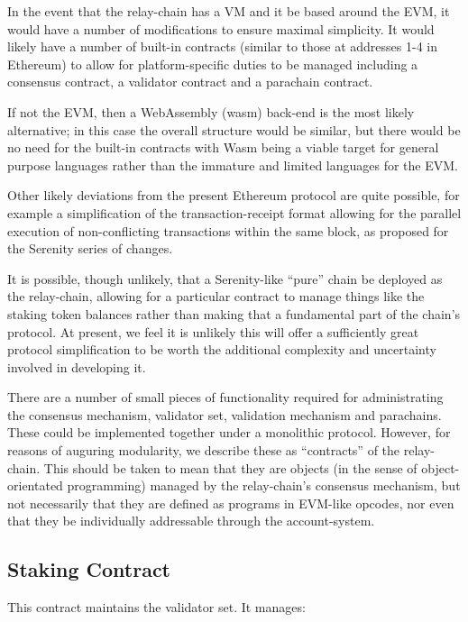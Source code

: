 \documentclass[9pt,oneside]{amsart}
\begin{document}
\begin{multicols}{2}
 In the event that the relay-chain has a VM and it be based around the EVM, it would have a number of modifications to ensure maximal simplicity. It would likely have a number of built-in contracts (similar to those at addresses 1-4 in Ethereum) to allow for platform-specific duties to be managed including a consensus contract, a validator contract and a parachain contract.

 If not the EVM, then a WebAssembly\cite{webassembly} (wasm) back-end is the most likely alternative; in this case the overall structure would be similar, but there would be no need for the built-in contracts with Wasm being a viable target for general purpose languages rather than the immature and limited languages for the EVM.

 Other likely deviations from the present Ethereum protocol are quite possible, for example a simplification of the transaction-receipt format allowing for the parallel execution of non-conflicting transactions within the same block, as proposed for the Serenity series of changes.

 It is possible, though unlikely, that a Serenity-like ``pure'' chain be deployed as the relay-chain, allowing for a particular contract to manage things like the staking token balances rather than making that a fundamental part of the chain's protocol. At present, we feel it is unlikely this will offer a sufficiently great protocol simplification to be worth the additional complexity and uncertainty involved in developing it.

 There are a number of small pieces of functionality required for administrating the consensus mechanism, validator set, validation mechanism and parachains. These could be implemented together under a monolithic protocol. However, for reasons of auguring modularity, we describe these as ``contracts'' of the relay-chain. This should be taken to mean that they are objects (in the sense of object-orientated programming) managed by the relay-chain's consensus mechanism, but not necessarily that they are defined as programs in EVM-like opcodes, nor even that they be individually addressable through the account-system.

\subsection{Staking Contract}
\label{staking-contract}

 This contract maintains the validator set. It manages:


\end{multicols}
\end{document}
